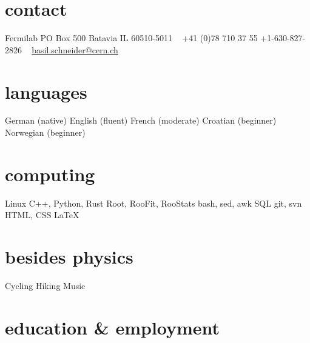 \documentclass[]{cv} %
\begin{document}


\begin{aside} %
  \section{contact}
  Fermilab
  PO Box 500
  Batavia IL 60510-5011
  ~
  +41 (0)78 710 37 55
  +1-630-827-2826
  ~
  \href{mailto:basil.schneider@cern.ch}{basil.schneider@cern.ch}
  \section{languages}
  German (native)
  English (fluent)
  French (moderate)
  Croatian (beginner)
  Norwegian (beginner)
  \section{computing}
  Linux
  C++, Python, Rust
  Root, RooFit, RooStats
  bash, sed, awk
  SQL
  git, svn
  HTML, CSS
  \LaTeX
  \section{besides physics}
  Cycling
  Hiking
  Music
\end{aside}


\section{education \& employment}
\end{document}
